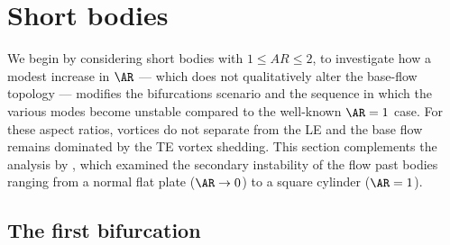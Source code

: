 \section{Short bodies}
\label{sec:short}

We begin by considering short bodies with $1 \le AR \le 2$, to investigate how a modest increase in $\AR$ --- which does not qualitatively alter the base-flow topology --- modifies the bifurcations scenario and the sequence in which the various modes become unstable compared to the well-known $\AR=1$ case. For these aspect ratios, vortices do not separate from the LE and the base flow remains dominated by the TE vortex shedding. This section complements the analysis by \cite{choi-yang-2014}, which examined the secondary instability of the flow past bodies ranging from a normal flat plate ($\AR \rightarrow 0$) to a square cylinder ($\AR=1$).

\subsection{The first bifurcation}

